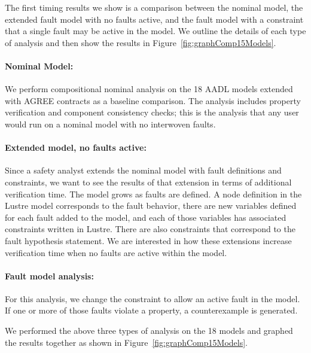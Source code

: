 The first timing results we show is a comparison between the nominal model, the extended fault model with no faults active, and the fault model with a constraint that a single fault may be active in the model. We outline the details of each type of analysis and then show the results in Figure~\ref{fig:graphComp15Models}.

\paragraph{Nominal Model:} We perform compositional nominal analysis on the 18 AADL models extended with AGREE contracts as a baseline comparison. The analysis includes property verification and component consistency checks; this is the analysis that any user would run on a nominal model with no interwoven faults. 

\paragraph{Extended model, no faults active:} Since a safety analyst extends the nominal model with fault definitions and constraints, we want to see the results of that extension in terms of additional verification time. The model grows as faults are defined. A node definition in the Lustre model corresponds to the fault behavior, there are new variables defined for each fault added to the model, and each of those variables has associated constraints written in Lustre. There are also constraints that correspond to the fault hypothesis statement. We are interested in how these extensions increase verification time when no faults are active within the model. 

\paragraph{Fault model analysis:} For this analysis, we change the constraint to allow an active fault in the model. If one or more of those faults violate a property, a counterexample is generated.

We performed the above three types of analysis on the 18 models and graphed the results together as shown in Figure~\ref{fig:graphComp15Models}. 

